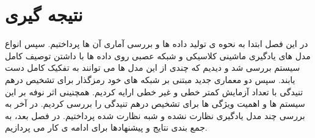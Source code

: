 \section{نتیجه گیری}

در این فصل ابتدا به نحوه ی تولید داده ها و بررسی آماری آن ها پرداختیم. سپس انواع مدل های یادگیری ماشینی کلاسیکی و شبکه عصبی روی داده ها با داشتن توصیف کامل سیستم بررسی شد و دیدیم که چندی از این مدل ها می توانند به تفکیک کامل دست یابند. سپس دو معماری جدید مبتنی بر شبکه های خود رمزگذار برای تشخیص درهم تنیدگی با تعداد آزمایش کمتر خطی و غیر خطی ارایه کردیم. همچنینی اثر نوفه بر این سیستم ها و اهمیت ویژگی ها برای تشخیص درهم تنیدگی را بررسی کردیم. در آخر به بررسی چند مدل یادگیری نظارت نشده و شبه نظارت شده پرداختیم. در فصل بعد، به جمع بندی نتایج و پیشنهادها برای ادامه ی کار می پردازیم.
